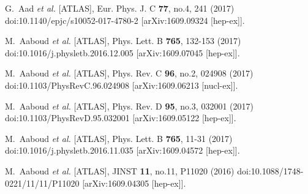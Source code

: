 \begin{thebibliography}{9}
G.~Aad \textit{et al.} [ATLAS],
Eur. Phys. J. C \textbf{77}, no.4, 241 (2017)
doi:10.1140/epjc/s10052-017-4780-2
[arXiv:1609.09324 [hep-ex]].

M.~Aaboud \textit{et al.} [ATLAS],
Phys. Lett. B \textbf{765}, 132-153 (2017)
doi:10.1016/j.physletb.2016.12.005
[arXiv:1609.07045 [hep-ex]].

M.~Aaboud \textit{et al.} [ATLAS],
Phys. Rev. C \textbf{96}, no.2, 024908 (2017)
doi:10.1103/PhysRevC.96.024908
[arXiv:1609.06213 [nucl-ex]].

M.~Aaboud \textit{et al.} [ATLAS],
Phys. Rev. D \textbf{95}, no.3, 032001 (2017)
doi:10.1103/PhysRevD.95.032001
[arXiv:1609.05122 [hep-ex]].

M.~Aaboud \textit{et al.} [ATLAS],
Phys. Lett. B \textbf{765}, 11-31 (2017)
doi:10.1016/j.physletb.2016.11.035
[arXiv:1609.04572 [hep-ex]].

M.~Aaboud \textit{et al.} [ATLAS],
JINST \textbf{11}, no.11, P11020 (2016)
doi:10.1088/1748-0221/11/11/P11020
[arXiv:1609.04305 [hep-ex]].


\end{thebibliography}
